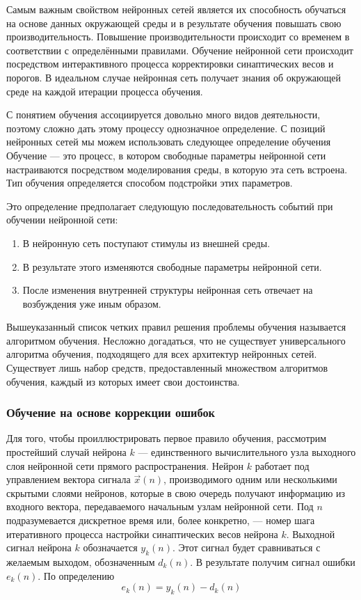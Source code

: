 Самым важным свойством нейронных сетей является их способность обучаться на основе данных окружающей среды и в  результате обучения повышать свою производительность.
Повышение производительности происходит со временем в соответствии с определёнными правилами.
Обучение нейронной сети происходит посредством интерактивного
процесса корректировки синаптических весов и порогов.
В идеальном случае нейронная сеть получает знания об окружающей среде на каждой итерации процесса обучения.

С понятием обучения ассоциируется довольно много видов деятельности, поэтому сложно дать этому процессу однозначное определение.
С позиций нейронных сетей мы можем использовать следующее определение обучения
Обучение ---  это процесс, в котором свободные параметры нейронной сети настраиваются посредством моделирования среды, в которую эта сеть встроена.
Тип обучения определяется способом подстройки этих параметров. 

Это определение предполагает следующую последовательность событий при обучении нейронной сети:

\begin{enumerate}
	\item В нейронную сеть поступают стимулы из внешней среды.

	\item В результате этого изменяются свободные параметры нейронной сети.

	\item После изменения внутренней структуры нейронная сеть отвечает на возбуждения уже иным образом.
\end{enumerate}

Вышеуказанный список четких правил решения проблемы обучения называется алгоритмом обучения. 
Несложно догадаться, что не существует универсального алгоритма обучения, подходящего для всех архитектур нейронных сетей.
Существует лишь набор средств, предоставленный множеством алгоритмов обучения, каждый из которых имеет свои достоинства.\cite{NejronnyeSeti}

\subsubsection{Обучение на основе коррекции ошибок}

Для того, чтобы проиллюстрировать первое правило обучения, рассмотрим простейший случай нейрона $k$ --- единственного вычислительного узла выходного слоя нейронной сети прямого распространения.
Нейрон $k$ работает под управлением вектора сигнала $\vec x (n)$, производимого одним или несколькими скрытыми слоями нейронов, которые в свою очередь получают информацию из входного вектора, передаваемого начальным узлам нейронной сети.
Под $n$ подразумевается дискретное время или, более конкретно, --- номер шага итеративного процесса настройки синаптических весов нейрона $k$.
Выходной сигнал нейрона $k$ обозначается $y_k(n)$.
Этот сигнал будет сравниваться с желаемым выходом, обозначенным $d_k(n)$.
В результате получим сигнал ошибки $e_k(n)$.
По определению
\begin{equation}
e_k(n) = y_k(n) - d_k(n)
\end{equation}

